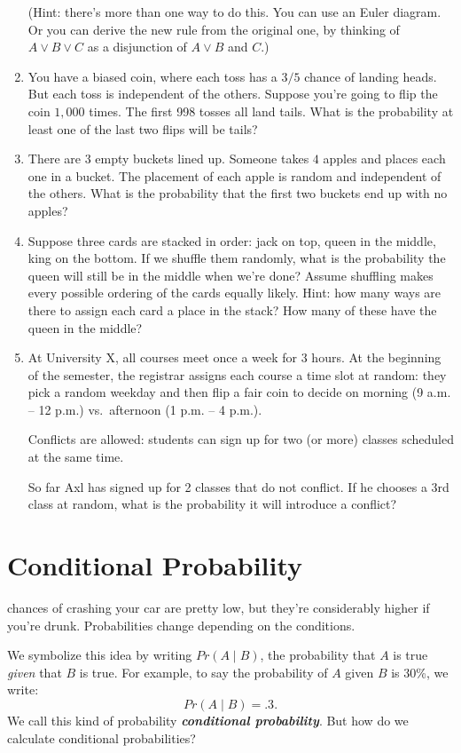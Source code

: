 \documentclass[justified]{tufte-book}
\newcommand{\given}{\mid}
\newcommand{\p}{Pr}
\theoremstyle{definition}
\theoremstyle{definition}
\theoremstyle{definition}
\theoremstyle{definition}
\theoremstyle{remark}
\begin{document}
\begin{enumerate}
  (Hint: there's more than one way to do this. You can use an Euler diagram. Or you can derive the new rule from the original one, by thinking of \(A \vee B \vee C\) as a disjunction of \(A \vee B\) and \(C\).)
\item
  You have a biased coin, where each toss has a \(3/5\) chance of landing heads. But each toss is independent of the others. Suppose you're going to flip the coin \(1,000\) times. The first 998 tosses all land tails. What is the probability at least one of the last two flips will be tails?
\item
  There are \(3\) empty buckets lined up. Someone takes \(4\) apples and places each one in a bucket. The placement of each apple is random and independent of the others. What is the probability that the first two buckets end up with no apples?
\item
  Suppose three cards are stacked in order: jack on top, queen in the middle, king on the bottom. If we shuffle them randomly, what is the probability the queen will still be in the middle when we're done? Assume shuffling makes every possible ordering of the cards equally likely. Hint: how many ways are there to assign each card a place in the stack? How many of these have the queen in the middle?
\item
  At University X, all courses meet once a week for 3 hours. At the beginning of the semester, the registrar assigns each course a time slot at random: they pick a random weekday and then flip a fair coin to decide on morning (9 a.m. -- 12 p.m.) vs.~afternoon (1 p.m. -- 4 p.m.).

  Conflicts are allowed: students can sign up for two (or more) classes scheduled at the same time.

  So far Axl has signed up for 2 classes that do not conflict. If he chooses a 3rd class at random, what is the probability it will introduce a conflict?
\end{enumerate}

\hypertarget{conditional-probability}{%
\chapter{Conditional Probability}\label{conditional-probability}}

 chances of crashing your car are pretty low, but they're considerably higher if you're drunk. Probabilities change depending on the conditions.

We symbolize this idea by writing \(\p(A \given B)\), the probability that \(A\) is true \emph{given} that \(B\) is true. For example, to say the probability of \(A\) given \(B\) is 30\%, we write:
\[ \p(A \given B) = .3. \]
We call this kind of probability \textbf{\emph{conditional probability}}. But how do we calculate conditional probabilities?
\end{document}
